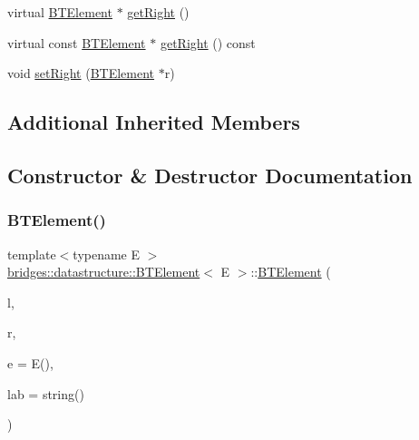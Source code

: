\begin{DoxyCompactItemize}
virtual \mbox{\hyperlink{classbridges_1_1datastructure_1_1_b_t_element}{B\+T\+Element}} $\ast$ \mbox{\hyperlink{classbridges_1_1datastructure_1_1_b_t_element_a3f73fcc5a7ed1af1a628803879682f80}{get\+Right}} ()
\item 
virtual const \mbox{\hyperlink{classbridges_1_1datastructure_1_1_b_t_element}{B\+T\+Element}} $\ast$ \mbox{\hyperlink{classbridges_1_1datastructure_1_1_b_t_element_afc0f4e1454bbdfb6a61ae9acf606e22a}{get\+Right}} () const
\item 
void \mbox{\hyperlink{classbridges_1_1datastructure_1_1_b_t_element_a016dfb73d148418ba581cfec96375db3}{set\+Right}} (\mbox{\hyperlink{classbridges_1_1datastructure_1_1_b_t_element}{B\+T\+Element}} $\ast$r)
\end{DoxyCompactItemize}
\subsection*{Additional Inherited Members}


\subsection{Constructor \& Destructor Documentation}
\mbox{\label{classbridges_1_1datastructure_1_1_b_t_element_a7d93a35b1f2553cfd92a289a363caa5a}} 
\subsubsection{\texorpdfstring{BTElement()}{BTElement()}\hspace{0.1cm}{\footnotesize\ttfamily [1/2]}}
{\footnotesize\ttfamily template$<$typename E $>$ \\
\mbox{\hyperlink{classbridges_1_1datastructure_1_1_b_t_element}{bridges\+::datastructure\+::\+B\+T\+Element}}$<$ E $>$\+::\mbox{\hyperlink{classbridges_1_1datastructure_1_1_b_t_element}{B\+T\+Element}} (\begin{DoxyParamCaption}\item[{\mbox{\hyperlink{classbridges_1_1datastructure_1_1_b_t_element}{B\+T\+Element}}$<$ E $>$ $\ast$}]{l,  }\item[{\mbox{\hyperlink{classbridges_1_1datastructure_1_1_b_t_element}{B\+T\+Element}}$<$ E $>$ $\ast$}]{r,  }\item[{const E \&}]{e = {\ttfamily E()},  }\item[{const string \&}]{lab = {\ttfamily string()} }\end{DoxyParamCaption})\hspace{0.3cm}{\ttfamily [inline]}}



